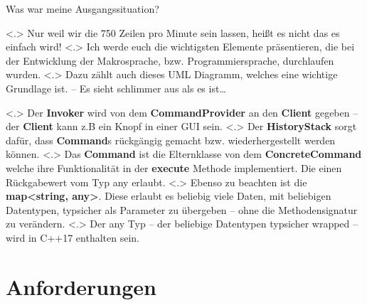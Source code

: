 \begin{frame}{Was war meine Ausgangssituation?}
\begin{itemize}[<+- | alert@+>]
\begin{uncoverenv}
\begin{uncoverenv}
%
          \end{uncoverenv}%
              \note[item]<.>{
                Nur weil wir die 750 Zeilen pro Minute sein lassen, heißt es nicht das es einfach wird!
              }
              \note[item]<.>{
                Ich werde euch die wichtigsten Elemente präsentieren, die bei der Entwicklung der Makrosprache, bzw. Programmiersprache, durchlaufen wurden.
              }
              \note[item]<.>{
                Dazu zählt auch dieses UML Diagramm, welches eine wichtige Grundlage ist. -- Es sieht schlimmer aus als es ist\ldots
              }
          \action{}
        \end{uncoverenv}
            \note[item]<.>{
              Der \textbf{Invoker} wird von dem \textbf{CommandProvider} an den \textbf{Client} gegeben -- der \textbf{Client} kann z.B ein Knopf in einer GUI sein.
            }
            \note[item]<.>{
              Der \textbf{HistoryStack} sorgt dafür, dass \textbf{Command}s rückgängig gemacht bzw. wiederhergestellt werden können.
            }
            \note[item]<.>{
              Das \textbf{Command} ist die Elternklasse von dem \textbf{ConcreteCommand} welche ihre Funktionalität in der \textbf{execute} Methode implementiert. Die einen Rückgabewert vom Typ any erlaubt.
            }
            \note[item]<.>{
              Ebenso zu beachten ist die \textbf{map<string, any>}. Diese erlaubt es beliebig viele Daten, mit beliebigen Datentypen, typsicher als Parameter zu übergeben -- ohne die Methodensignatur zu verändern.
            }
            \note[item]<.>{
              Der any Typ -- der beliebige Datentypen typsicher wrapped -- wird in C++17 enthalten sein.
            }
    \end{itemize}
  \end{frame}

\section{Anforderungen}

